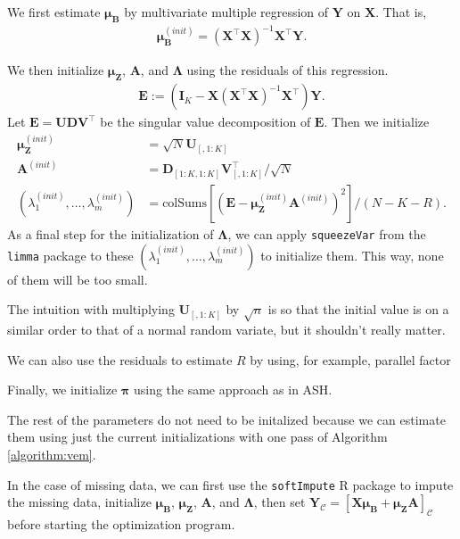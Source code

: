 \documentclass[11pt,authoryear]{article}
\newcommand{\bs}[1]{\boldsymbol{#1}}
\begin{document}
We first estimate $\bs{\mu}_{\bs{B}}$ by multivariate multiple regression of $\bs{Y}$ on $\bs{X}$. That is,
\begin{align}
\bs{\mu}_{\bs{B}}^{(init)} = (\bs{X}^{\intercal}\bs{X})^{-1}\bs{X}^{\intercal}\bs{Y}.
\end{align}

We then initialize $\bs{\mu}_{\bs{Z}}$, $\bs{A}$, and $\bs{\Lambda}$ using the residuals of this regression.
\begin{align}
\bs{E} := (\bs{I}_{K} - \bs{X}(\bs{X}^{\intercal}\bs{X})^{-1}\bs{X}^{\intercal})\bs{Y}.
\end{align}
Let $\bs{E} = \bs{U}\bs{D}\bs{V}^{\intercal}$ be the singular value decomposition of $\bs{E}$. Then we initialize
\begin{align}
\bs{\mu}_{\bs{Z}}^{(init)} &= \sqrt{N}\bs{U}_{[, 1:K]}\\
\bs{A}^{(init)} &= \bs{D}_{[1:K, 1:K]}\bs{V}_{[, 1:K]}^{\intercal}/\sqrt{N}\\
(\lambda_1^{(init)},\ldots,\lambda_m^{(init)}) &= \text{colSums}\left[(\bs{E} - \bs{\mu}_{\bs{Z}}^{(init)}\bs{A}^{(init)})^2\right] / (N - K - R).
\end{align}
As a final step for the initialization of $\bs{\Lambda}$, we can apply
\texttt{squeezeVar} from the \texttt{limma} package to these
$(\lambda_1^{(init)},\ldots,\lambda_m^{(init)})$ to initialize
them. This way, none of them will be too small.

The intuition with multiplying $\bs{U}_{[, 1:K]}$ by $\sqrt{n}$ is so
that the initial value is on a similar order to that of a normal
random variate, but it shouldn't really matter.

We can also use the residuals to estimate $R$ by using, for example, parallel factor

Finally, we initialize $\bs{\pi}$ using the same approach as in ASH.

The rest of the parameters do not need to be initalized because we can
estimate them using just the current initializations with one pass of
Algorithm \ref{algorithm:vem}.

In the case of missing data, we can first use the \texttt{softImpute}
R package to impute the missing data, initialize $\bs{\mu}_{\bs{B}}$,
$\bs{\mu}_{\bs{Z}}$, $\bs{A}$, and $\bs{\Lambda}$, then set
$\bs{Y}_{\mathcal{C}} = \left[\bs{X}\bs{\mu}_{\bs{B}} +
  \bs{\mu}_{\bs{Z}}\bs{A}\right]_{\mathcal{C}}$ before starting the
optimization program.
\end{document}
